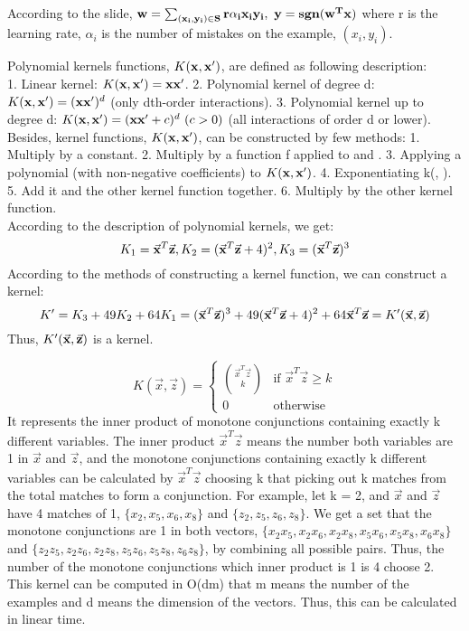 \item[(a)]
According to the slide, $
\bf{w} = \sum_{(x_i,y_i) \in S} r\alpha_i x_iy_i,\mbox{ } y = sgn(\bf{w}^T x)
$ where r is the learning rate, $\alpha_i$ is the number of mistakes on the example, $(x_i,y_i)$. 
\item[(b)]
    Polynomial kernels functions, $K({\bf x},{\bf x}')$, are defined as following description: \\
    1. Linear kernel: $K({\bf x},{\bf x}') = {\bf x}{\bf x}'$. 2. Polynomial kernel of degree d: $K({\bf x},{\bf x}') = ({\bf x}{\bf x}')^d$ (only dth-order interactions). 3. Polynomial kernel up to degree d: $K(\bb{x},\bb{x}') = (\bb{x}\bb{x}'+c)^d \ (c>0)$ (all interactions of order d or lower).\\ 
    Besides, kernel functions, $K({\bf x},{\bf x}')$, can be constructed by few methods: 1. Multiply by a constant. 2. Multiply by a function f applied to  and . 3. Applying a polynomial (with non-negative coefficients) to $K({\bf x},{\bf x}')$. 4. Exponentiating k(, ). 5. Add it and the other kernel function together. 6. Multiply by the other kernel function.\\
    According to the description of polynomial kernels, we get:
    \begin{equation*}
      K_1 = \vec{{\bf x}}^T\vec{{\bf z}}, K_2 = (\vec{{\bf x}}^T\vec{{\bf z}} + 4)^2, K_3 = (\vec{{\bf x}}^T\vec{{\bf z}})^3
    \end{equation*}
    According to the methods of constructing a kernel function, we can construct a kernel:    
    \begin{equation*}
      K' = K_3 + 49K_2 + 64K_1 = (\vec{{\bf x}}^T\vec{{\bf z}})^3 
                                      + 49(\vec{{\bf x}}^T\vec{{\bf z}} + 4)^2 
                                      + 64 \vec{{\bf x}}^T\vec{{\bf z}} = K'(\vec{{\bf x}},\vec{{\bf z}})
    \end{equation*}
    Thus, $K'(\vec{{\bf x}},\vec{{\bf z}})$ is a kernel.
\item[(c)]
\begin{equation*}
  K(\vec{x},\vec{z}) = 
  \begin{cases}
    {\vec{x}^T\vec{z} \choose k} & \mbox{if } \vec{x}^T\vec{z} \ge k \\
    0 & \mbox{otherwise}
  \end{cases}  
\end{equation*}
It represents the inner product of monotone conjunctions containing exactly k different variables. The inner product $\vec{x}^T\vec{z}$ means the number both variables are 1 in $\vec{x}$ and $\vec{z}$, and the monotone conjunctions containing exactly k different variables can be calculated by $\vec{x}^T\vec{z}$ choosing k that picking out k matches from the total matches to form a conjunction. For example, let k = 2, and $\vec{x}$ and $\vec{z}$ have 4 matches of 1, $\{x_2, x_5, x_6, x_8\}$ and $\{z_2, z_5, z_6, z_8\}$. We get a set that the monotone conjunctions are 1 in both vectors, $\{x_2x_5, x_2x_6, x_2x_8, x_5x_6, x_5x_8, x_6x_8 \}$ and $\{z_2z_5, z_2z_6, z_2z_8, z_5z_6, z_5z_8, z_6z_8 \}$, by combining all possible pairs. Thus, the number of the monotone conjunctions which inner product is 1 is 4 choose 2. 
This kernel can be computed in O(dm) that m means the number of the examples and d means the dimension of the vectors. Thus, this can be calculated in linear time.

